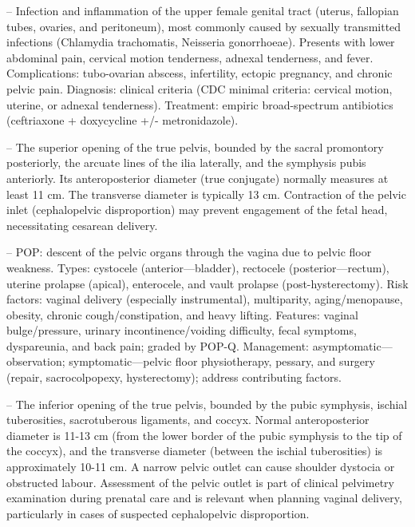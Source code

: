 -- Infection and inflammation of the upper female genital tract (uterus, fallopian tubes, ovaries, and peritoneum), most commonly caused by sexually transmitted infections (Chlamydia trachomatis, Neisseria gonorrhoeae). Presents with lower abdominal pain, cervical motion tenderness, adnexal tenderness, and fever. Complications: tubo-ovarian abscess, infertility, ectopic pregnancy, and chronic pelvic pain. Diagnosis: clinical criteria (CDC minimal criteria: cervical motion, uterine, or adnexal tenderness). Treatment: empiric broad-spectrum antibiotics (ceftriaxone + doxycycline +/- metronidazole).

-- The superior opening of the true pelvis, bounded by the sacral promontory posteriorly, the arcuate lines of the ilia laterally, and the symphysis pubis anteriorly. Its anteroposterior diameter (true conjugate) normally measures at least 11 cm. The transverse diameter is typically 13 cm. Contraction of the pelvic inlet (cephalopelvic disproportion) may prevent engagement of the fetal head, necessitating cesarean delivery.

-- POP: descent of the pelvic organs through the vagina due to pelvic floor weakness. Types: cystocele (anterior—bladder), rectocele (posterior—rectum), uterine prolapse (apical), enterocele, and vault prolapse (post-hysterectomy). Risk factors: vaginal delivery (especially instrumental), multiparity, aging/menopause, obesity, chronic cough/constipation, and heavy lifting. Features: vaginal bulge/pressure, urinary incontinence/voiding difficulty, fecal symptoms, dyspareunia, and back pain; graded by POP-Q. Management: asymptomatic—observation; symptomatic—pelvic floor physiotherapy, pessary, and surgery (repair, sacrocolpopexy, hysterectomy); address contributing factors.

-- The inferior opening of the true pelvis, bounded by the pubic symphysis, ischial tuberosities, sacrotuberous ligaments, and coccyx. Normal anteroposterior diameter is 11-13 cm (from the lower border of the pubic symphysis to the tip of the coccyx), and the transverse diameter (between the ischial tuberosities) is approximately 10-11 cm. A narrow pelvic outlet can cause shoulder dystocia or obstructed labour. Assessment of the pelvic outlet is part of clinical pelvimetry examination during prenatal care and is relevant when planning vaginal delivery, particularly in cases of suspected cephalopelvic disproportion.

